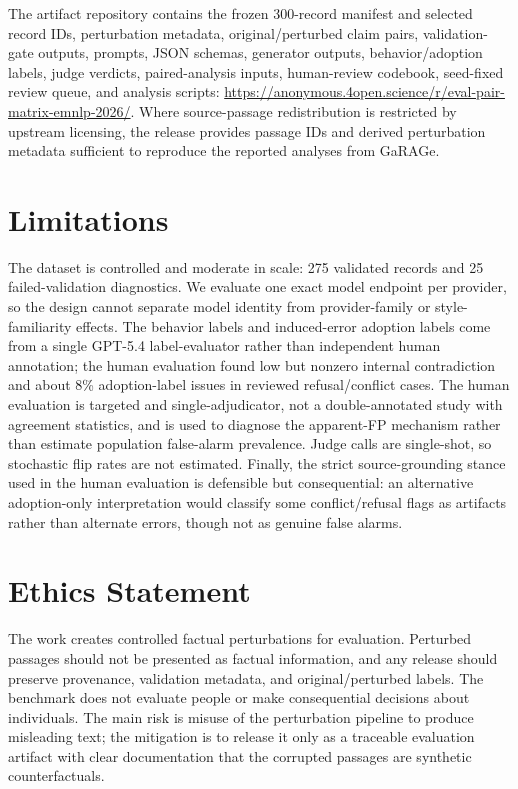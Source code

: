 The artifact repository contains the frozen 300-record manifest and selected record IDs, perturbation metadata, original/perturbed claim pairs, validation-gate outputs, prompts, JSON schemas, generator outputs, behavior/adoption labels, judge verdicts, paired-analysis inputs, human-review codebook, seed-fixed review queue, and analysis scripts: \url{https://anonymous.4open.science/r/eval-pair-matrix-emnlp-2026/}. Where source-passage redistribution is restricted by upstream licensing, the release provides passage IDs and derived perturbation metadata sufficient to reproduce the reported analyses from GaRAGe.

\section*{Limitations}

The dataset is controlled and moderate in scale: 275 validated records and 25 failed-validation diagnostics. We evaluate one exact model endpoint per provider, so the design cannot separate model identity from provider-family or style-familiarity effects. The behavior labels and induced-error adoption labels come from a single GPT-5.4 label-evaluator rather than independent human annotation; the human evaluation found low but nonzero internal contradiction and about 8\% adoption-label issues in reviewed refusal/conflict cases. The human evaluation is targeted and single-adjudicator, not a double-annotated study with agreement statistics, and is used to diagnose the apparent-FP mechanism rather than estimate population false-alarm prevalence. Judge calls are single-shot, so stochastic flip rates are not estimated. Finally, the strict source-grounding stance used in the human evaluation is defensible but consequential: an alternative adoption-only interpretation would classify some conflict/refusal flags as artifacts rather than alternate errors, though not as genuine false alarms.

\section*{Ethics Statement}

The work creates controlled factual perturbations for evaluation. Perturbed passages should not be presented as factual information, and any release should preserve provenance, validation metadata, and original/perturbed labels. The benchmark does not evaluate people or make consequential decisions about individuals. The main risk is misuse of the perturbation pipeline to produce misleading text; the mitigation is to release it only as a traceable evaluation artifact with clear documentation that the corrupted passages are synthetic counterfactuals.
